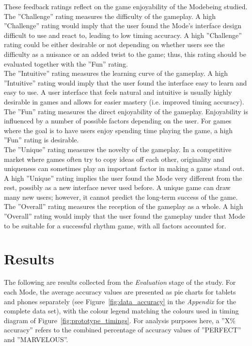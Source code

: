 \documentclass{sig-alternate}
\begin{document}
These feedback ratings reflect on the game enjoyability of the Modebeing studied. \\

The ''Challenge'' rating measures the difficulty of the gameplay. A high ''Challenge'' rating would imply that the user found the Mode's interface design difficult to use and react to, leading to low timing accuracy. A high ''Challenge'' rating could be either desirable or not depending on whether users see the difficulty as a nuisance or an added twist to the game; thus, this rating should be evaluated together with the ''Fun'' rating.\\

The ''Intuitive'' rating measures the learning curve of the gameplay. A high ''Intuitive'' rating would imply that the user found the interface easy to learn and easy to use. A user interface that feels natural and intuitive is usually highly desirable in games and allows for easier mastery (i.e. improved timing accuracy).\\

The ''Fun'' rating measures the direct enjoyability of the gameplay. Enjoyability is influenced by a number of possible factors depending on the user. For games where the goal is to have users enjoy spending time playing the game, a high ''Fun'' rating is desirable. \\

The ''Unique'' rating measures the novelty of the gameplay. In a competitive market where games often try to copy ideas off each other, originality and uniqueness can sometimes play an important factor in making a game stand out. A high ''Unique'' rating implies the user found the Mode very different from the rest, possibly as a new interface never used before. A unique game can draw many new users; however, it cannot predict the long-term success of the game. \\

The ''Overall'' rating measures the reception of the gameplay as a whole. A high ''Overall'' rating would imply that the user found the gameplay under that Mode to be suitable for a successful rhythm game, with all factors accounted for.

\section{Results}
\label{sec:results}

The following are results collected from the \textit{Evaluation} stage of the study. For each Mode, the average accuracy values are presented as pie charts for tablets and phones separately (see Figure~\ref{fig:data_accuracy} in the \textit{Appendix} for the complete data set), with the colour legend matching the colours used in timing diagram of Figure~\ref{fig:prototype_timings}. For analysis purposes here, a ''X\% accuracy'' refers to the combined percentage of accuracy values of ''PERFECT'' and ''MARVELOUS''.\\
\end{document}

